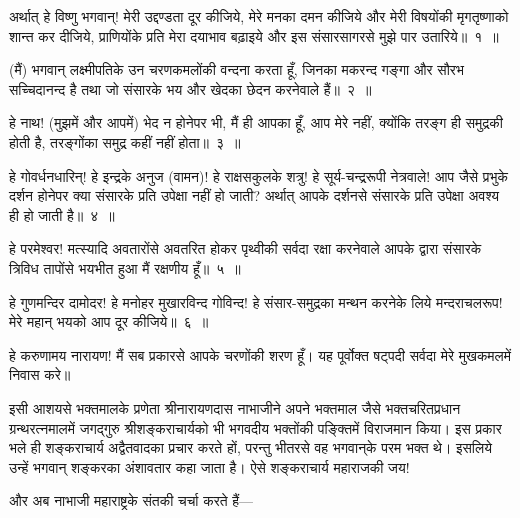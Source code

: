 \begin{sloppypar}\justifying{}
अर्थात् हे विष्णु भगवान्! मेरी उद्दण्डता दूर कीजिये, मेरे मनका दमन कीजिये और मेरी विषयोंकी मृगतृष्णाको शान्त कर दीजिये, प्राणियोंके प्रति मेरा दयाभाव बढ़ाइये और इस संसार\-सागरसे मुझे पार उतारिये॥~१~॥
\end{sloppypar}
\begin{sloppypar}\justifying{}
(मैं) भगवान् लक्ष्मीपतिके उन चरणकमलोंकी वन्दना करता हूँ, जिनका मकरन्द गङ्गा और सौरभ सच्चिदानन्द है तथा जो संसारके भय और खेदका छेदन करनेवाले हैं॥~२~॥
\end{sloppypar}
\begin{sloppypar}\justifying{}
हे नाथ! (मुझमें और आपमें) भेद न होनेपर भी, मैं ही आपका हूँ, आप मेरे नहीं, क्योंकि तरङ्ग ही समुद्रकी होती है, तरङ्गोंका समुद्र कहीं नहीं होता॥~३~॥
\end{sloppypar}
\begin{sloppypar}\justifying{}
हे गोवर्धनधारिन्! हे इन्द्रके अनुज (वामन)! हे राक्षसकुलके शत्रु! हे सूर्य-चन्द्ररूपी नेत्रवाले! आप जैसे प्रभुके दर्शन होनेपर क्या संसारके प्रति उपेक्षा नहीं हो जाती? अर्थात् आपके दर्शनसे संसारके प्रति उपेक्षा अवश्य ही हो जाती है॥~४~॥
\end{sloppypar}
\begin{sloppypar}\justifying{}
हे परमेश्वर! मत्स्यादि अवतारोंसे अवतरित होकर पृथ्वीकी सर्वदा रक्षा करनेवाले आपके द्वारा संसारके त्रिविध तापोंसे भयभीत हुआ मैं रक्षणीय हूँ॥~५~॥
\end{sloppypar}
\begin{sloppypar}\justifying{}
हे गुणमन्दिर दामोदर! हे मनोहर मुखारविन्द गोविन्द! हे संसार-समुद्रका मन्थन करनेके लिये मन्दराचलरूप! मेरे महान् भयको आप दूर कीजिये॥~६~॥
\end{sloppypar}
\begin{sloppypar}\justifying{}
हे करुणामय नारायण! मैं सब प्रकारसे आपके चरणोंकी शरण हूँ। यह पूर्वोक्त षट्पदी सर्वदा मेरे मुखकमलमें निवास करे॥
\end{sloppypar}
\begin{sloppypar}\justifying{}
इसी आशयसे भक्तमालके प्रणेता श्रीनारायणदास नाभाजीने अपने भक्तमाल जैसे भक्तचरित\-प्रधान ग्रन्थरत्नमालमें जगद्गुरु श्रीशङ्कराचार्यको भी भगवदीय भक्तोंकी पङ्क्तिमें विराजमान किया। इस प्रकार भले ही शङ्कराचार्य अद्वैतवादका प्रचार करते हों, परन्तु भीतरसे वह भगवान्‌के परम भक्त थे। इसलिये उन्हें भगवान् शङ्करका अंशावतार कहा जाता है। ऐसे शङ्कराचार्य महाराजकी जय!
\end{sloppypar}
\begin{sloppypar}\justifying{}
और अब नाभाजी महाराष्ट्रके संतकी चर्चा करते हैं—
\end{sloppypar}

